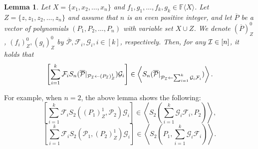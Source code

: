 \documentclass[12pt,reqno]{article}
\newtheorem{lemma}[theorem]{Lemma}
\newcommand\F{\ensuremath{\mathbb F}}
\renewcommand{\t}[1]{\overline{#1}}
\newcommand{\anbra}[1]{\ensuremath{\left[ #1\right]}}
\newcommand{\zd}[2]{(#1)_Z^{#2}}
\newcommand{\ideal}[1]{\ensuremath{\left\langle #1\right\rangle}}
\newcommand\ii{{\cal I}}
\begin{document}
\begin{lemma}\label{lem:transfer-polynomials}
Let $X=\{x_1,x_2,\ldots,x_n\}$ and $f_1,g_1 ,\ldots,  f_k,g_k \in  \F \langle X \rangle $. Let $Z=\{z,z_1,z_2,\ldots,z_n\}$ and assume that  $n$ is an even positive integer, and let
$\t P $ be a vector of polynomials $(P_1,P_2,\ldots,P_n)$ with variable set $X\cup Z$. We denote $\zd{\t P}{0}$, $\zd{f_i}{0},
\zd{g_i}{0}$ by $\overline {\mathcal{P}},\mathcal F_i,\mathcal G_i,i\in[k]$, respectively. Then, for any $\ii\in [n]$, it holds that
\begin{equation}\label{eq:substitution-in-S_n}
\anbra{\sum_{i=1}^k\mathcal F_i S_{n}(\t {\mathcal P}|_{{\mathcal P}_\ii\leftarrow \zd{P_\ii}{1}})\mathcal G_i } \in  \ideal{ S_{n}(\t{\mathcal P}|_{{\mathcal P }_\ii\leftarrow \sum_{i=1}^k\mathcal G_i\mathcal F_i})}. 
\end{equation}
\end{lemma}
For example, when $n=2$, the above lemma shows the following:
$$\anbra{\sum_{i=1}^k\mathcal F_iS_2(\zd{P_1}{1},\mathcal P_2)\mathcal G_i}\in \ideal{S_2(\sum_{i=1}^k\mathcal G_i\mathcal F_i,P_2  )},$$
$$\anbra{\sum_{i=1}^k\mathcal F_i S_2(\mathcal P_1,\zd{P_2}{1})\mathcal G_i}\in \ideal{S_2(P_1, \sum_{i=1}^k\mathcal G_i\mathcal F_i )}.$$
\end{document}
